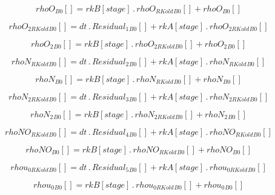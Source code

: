 \documentclass{article}
\begin{document}
\begin{dmath}{rhoO{_{B0}}}[{}] = {rkB}[{stage}] \,.\, {rhoO_{RKold}{_{B0}}}[{}] + {rhoO{_{B0}}}[{}]\end{dmath}

\begin{dmath}{rhoO_{2 RKold}{_{B0}}}[{}] = dt \,.\, {Residual_{1}{_{B0}}}[{}] + {rkA}[{stage}] \,.\, {rhoO_{2 RKold}{_{B0}}}[{}]\end{dmath}

\begin{dmath}{rhoO_{2}{_{B0}}}[{}] = {rkB}[{stage}] \,.\, {rhoO_{2 RKold}{_{B0}}}[{}] + {rhoO_{2}{_{B0}}}[{}]\end{dmath}

\begin{dmath}{rhoN_{RKold}{_{B0}}}[{}] = dt \,.\, {Residual_{2}{_{B0}}}[{}] + {rkA}[{stage}] \,.\, {rhoN_{RKold}{_{B0}}}[{}]\end{dmath}

\begin{dmath}{rhoN{_{B0}}}[{}] = {rkB}[{stage}] \,.\, {rhoN_{RKold}{_{B0}}}[{}] + {rhoN{_{B0}}}[{}]\end{dmath}

\begin{dmath}{rhoN_{2 RKold}{_{B0}}}[{}] = dt \,.\, {Residual_{3}{_{B0}}}[{}] + {rkA}[{stage}] \,.\, {rhoN_{2 RKold}{_{B0}}}[{}]\end{dmath}

\begin{dmath}{rhoN_{2}{_{B0}}}[{}] = {rkB}[{stage}] \,.\, {rhoN_{2 RKold}{_{B0}}}[{}] + {rhoN_{2}{_{B0}}}[{}]\end{dmath}

\begin{dmath}{rhoNO_{RKold}{_{B0}}}[{}] = dt \,.\, {Residual_{4}{_{B0}}}[{}] + {rkA}[{stage}] \,.\, {rhoNO_{RKold}{_{B0}}}[{}]\end{dmath}

\begin{dmath}{rhoNO{_{B0}}}[{}] = {rkB}[{stage}] \,.\, {rhoNO_{RKold}{_{B0}}}[{}] + {rhoNO{_{B0}}}[{}]\end{dmath}

\begin{dmath}{rhou_{0 RKold}{_{B0}}}[{}] = dt \,.\, {Residual_{5}{_{B0}}}[{}] + {rkA}[{stage}] \,.\, {rhou_{0 RKold}{_{B0}}}[{}]\end{dmath}

\begin{dmath}{rhou_{0}{_{B0}}}[{}] = {rkB}[{stage}] \,.\, {rhou_{0 RKold}{_{B0}}}[{}] + {rhou_{0}{_{B0}}}[{}]\end{dmath}
\end{document}
